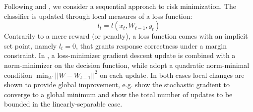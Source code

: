 \documentclass[preprint,12pt,authoryear]{elsarticle}
\begin{document}
Following   \cite{kivinen2004online} and \cite{crammer2006online}, we consider a sequential approach to risk minimization.
The classifier is updated through local measures of a loss function: 
$$l_t = l(x_t,W_{t-1},y_t)$$
 Contrarily to a mere reward (or penalty), a loss function comes with an implicit set point, namely $l_t=0$, that grants response correctness under a margin constraint. In \cite{kivinen2004online}, a loss-minimizer gradient descent update is combined with a norm-minimizer on the decision function, while \cite{crammer2006online} adopt a quadratic norm-minimal condition $\min_W ||W - W_{t-1}||^2$ on each update. In both cases local changes are shown to provide global improvement, e.g. \cite{kivinen2004online} show the stochastic gradient to converge to a global minimum and \cite{crammer2006online} show the total number of updates to be bounded in the linearly-separable case.

\end{document}
